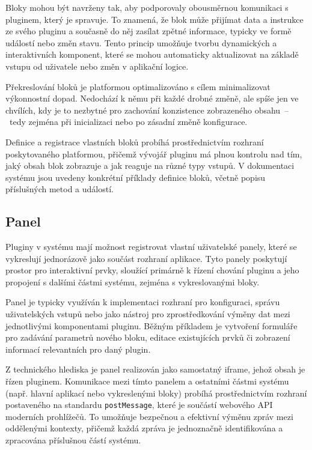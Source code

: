 Bloky mohou být navrženy tak, aby podporovaly obousměrnou komunikaci s pluginem, který je spravuje. 
To znamená, že blok může přijímat data a instrukce ze svého pluginu a současně do něj zasílat zpětné informace, typicky ve formě událostí nebo změn stavu. 
Tento princip umožňuje tvorbu dynamických a interaktivních komponent, které se mohou automaticky aktualizovat na základě vstupu od uživatele nebo změn v aplikační logice.

Překreslování bloků je platformou optimalizováno s cílem minimalizovat výkonnostní dopad. 
Nedochází k němu při každé drobné změně, ale spíše jen ve chvílích, kdy je to nezbytné pro zachování konzistence zobrazeného obsahu~--~tedy zejména při inicializaci nebo po zásadní změně konfigurace.

Definice a registrace vlastních bloků probíhá prostřednictvím rozhraní poskytovaného platformou, přičemž vývojář pluginu má plnou kontrolu nad tím, jaký obsah blok zobrazuje a jak reaguje na různé typy vstupů. 
V dokumentaci systému jsou uvedeny konkrétní příklady definice bloků, včetně popisu příslušných metod a událostí.


\subsection{Panel}

Pluginy v systému mají možnost registrovat vlastní uživatelské panely, které se vykreslují jednorázově jako součást rozhraní aplikace. 
Tyto panely poskytují prostor pro interaktivní prvky, sloužící primárně k řízení chování pluginu a jeho propojení s dalšími částmi systému, zejména s vykreslovanými bloky.

Panel je typicky využíván k implementaci rozhraní pro konfiguraci, správu uživatelských vstupů nebo jako nástroj pro zprostředkování výměny dat mezi jednotlivými komponentami pluginu. 
Běžným příkladem je vytvoření formuláře pro zadávání parametrů nového bloku, editace existujících prvků či zobrazení informací relevantních pro daný plugin.

Z technického hlediska je panel realizován jako samostatný iframe, jehož obsah je řízen pluginem. 
Komunikace mezi tímto panelem a ostatními částmi systému (např. hlavní aplikací nebo vykreslenými bloky) probíhá prostřednictvím rozhraní postaveného na standardu \texttt{postMessage}, které je součástí webového API moderních prohlížečů. 
To umožňuje bezpečnou a efektivní výměnu zpráv mezi oddělenými kontexty, přičemž každá zpráva je jednoznačně identifikována a zpracována příslušnou částí systému.

